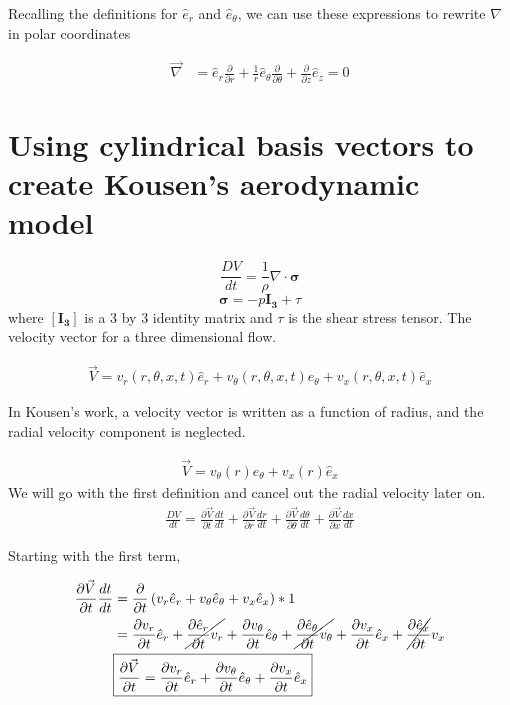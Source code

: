 \documentclass[12pt]{article}
\begin{document}
Recalling the definitions for $\hat{e}_r$ and $\hat{e}_{\theta}$, we can use these expressions to rewrite $\nabla$ in polar coordinates

\begin{align*}
	\vec{\nabla} 
	&= \hat{e}_r \frac{\partial} {\partial r} + 
	\frac{1}{r} \hat{e}_{\theta}   
	\frac{\partial} {\partial \theta} + 
	\frac{\partial }{\partial z} \hat{e}_z = 0
\end{align*}
\newpage
\newpage


\section{Using cylindrical basis vectors to create Kousen's aerodynamic model}


\[\frac{DV}{dt}                                               = \frac{1}{\rho} \nabla \cdot \boldsymbol{\sigma}\]
\[\boldsymbol{\sigma}                                         = -p\boldsymbol{I_3}+ \tau\]
where $\boldsymbol{[I_3]}$ is a 3 by 3 identity matrix and $\tau$ is the shear stress tensor. The velocity vector for a three dimensional flow.

\begin{align}
\vec{V} =
v_r(r,\theta,x,t) \hat{e}_r +
v_{\theta}(r,\theta,x,t) \hat{e}_{\theta} +
v_x(r,\theta,x,t) \hat{e}_x
\end{align}

In Kousen's work, a velocity vector is written as a function of radius, and the radial velocity component is neglected.

\begin{align}
\vec{V} = v_{\theta}(r) \hat{e}_{\theta} +
v_x(r) \hat{e}_x
\end{align}
We will go with the first definition and cancel out the radial velocity later on.
\begin{align*}
\frac{DV}{dt} =
\frac{\partial \vec{V}}{ \partial t}\frac{dt}{dt} +
\frac{\partial \vec{V}}{ \partial r}\frac{dr}{dt} +
\frac{\partial \vec{V}}{ \partial \theta}\frac{d\theta}{dt} +
\frac{\partial \vec{V}}{ \partial x}\frac{dx}{dt} 
\end{align*}


Starting with the first term,

\begin{align*}
\frac{\partial \vec{V}}{ \partial t}\frac{dt}{dt}	
&= \frac{\partial}{\partial t}
\left(
v_r 	   \hat{e}_r +
v_{\theta} \hat{e}_{\theta} +
v_x		   \hat{e}_x
\right) * 1 \\ 
&=
\frac{\partial 		  v_r}{\partial t} 		\hat{e}_r +
\cancel{\frac{\partial  \hat{e}_r}{\partial t} 		v_r}       +
\frac{\partial v_{\theta}}{\partial t}		\hat{e}_{\theta} +
\cancel{\frac{\partial \hat{e}_{\theta}}{\partial t} v_{\theta}}  +
\frac{\partial v_x}{\partial t}\hat{e}_{x} +
\cancel{\frac{\partial \hat{e}_{x}}{\partial t}}v_x \\  
&\boxed{
	\frac{\partial \vec{V}}{ \partial t} = 
	\frac{\partial 		  v_r}{\partial t} 		\hat{e}_r +
	\frac{\partial v_{\theta}}{\partial t}		\hat{e}_{\theta} + 
	\frac{\partial v_x}{\partial t}\hat{e}_{x}}
\end{align*}
\end{document}
